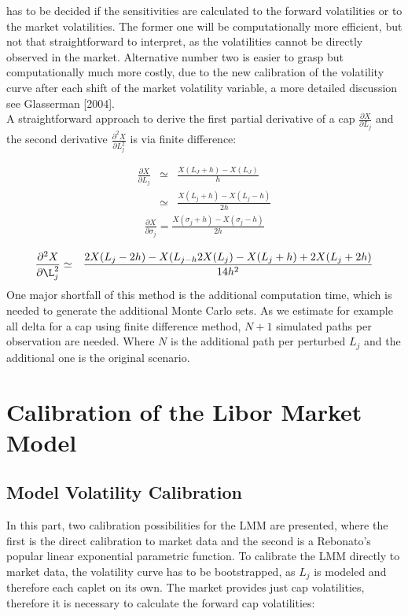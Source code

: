\documentclass[11pt]{article}
\numberwithin{equation}{subsection}
\begin{document}
has to be decided if the sensitivities are calculated to the forward volatilities or to the market volatilities. The former one will be computationally more efficient, but not that straightforward to interpret, as the volatilities cannot be directly observed in the market. Alternative number two is easier to grasp but computationally much more costly, due to the new calibration of the volatility curve after each shift of the market volatility variable, a more detailed discussion see Glasserman [2004].\\
A straightforward approach to derive the first partial derivative of a cap \(\frac{\partial X}{\partial L_j}\) and the second derivative \(\frac{\partial^2 X}{\partial L_j^2}\) is via finite difference:


\begin{eqnarray*}
	\frac{\partial X}{\partial L_j} &\simeq& \frac{X(L_J + h) - X(L_J)}{h} \\
	&\simeq& \frac{X(L_{j} + h) - X(L_{j} - h)}{2h}
\end{eqnarray*}	
\begin{eqnarray*}
	\frac{\partial X}{\partial \sigma_{j}} = \frac{X(\sigma_{j} + h) - X(\sigma_{j} - h)}{2h}
\end{eqnarray*}

\begin{eqnarray*}
	\frac{\partial^2 X}{\partial \L_{j}^2}  &\simeq&  \frac{2X(L_{j} -2h) - X(L_{j-h} 2X (L_{j}) -X(L_{j} + h) + 2X(L_j + 2h)}{14h^2}
\end{eqnarray*}
One major shortfall of this method is the additional computation time, which is needed to generate the additional Monte Carlo sets. As we estimate for example all delta for a cap using finite difference method, \(N+1\) simulated paths per observation are needed. Where \(N\) is the additional path per perturbed \(L_j\) and the additional one is the original scenario.


\section{Calibration of the Libor Market Model}
\subsection{Model Volatility Calibration}
In this part, two calibration possibilities for the LMM are presented, where the first is the direct calibration to market data and the second is a Rebonato's popular linear exponential parametric function. To calibrate the LMM directly to market data, the volatility curve has to be bootstrapped, as \(L_j\) is modeled and therefore each caplet on its own. The market provides just cap volatilities, therefore it is necessary to calculate the forward cap volatilities:
\end{document}
